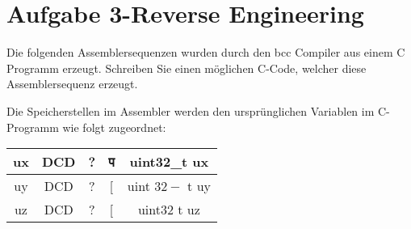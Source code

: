 \documentclass[10pt]{article}
\begin{document}
\section*{Aufgabe 3-Reverse Engineering}
Die folgenden Assemblersequenzen wurden durch den bcc Compiler aus einem C Programm erzeugt. Schreiben Sie einen möglichen C-Code, welcher diese Assemblersequenz erzeugt.

Die Speicherstellen im Assembler werden den ursprünglichen Variablen im C-Programm wie folgt zugeordnet:

\begin{center}
\begin{tabular}{|c|c|c|c|c|}
\hline
ux & DCD & ? & प & uint32\_t ux \\
\hline
uy & DCD & ? & [ & uint $32-$ t uy \\
\hline
uz & DCD & ? & [ & uint32 t uz \\
\hline
\end{tabular}
\end{center}
\end{document}
